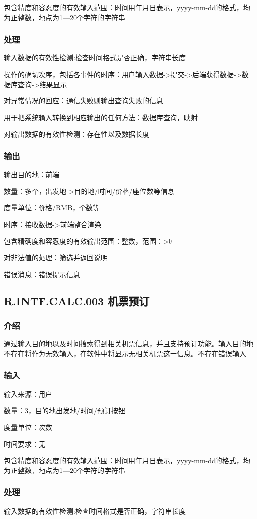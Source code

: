 		包含精度和容忍度的有效输入范围：时间用年月日表示，yyyy-mm-dd的格式，均为正整数，地点为1—20个字符的字符串
\subsubsection{处理}
	输入数据的有效性检测:检查时间格式是否正确，字符串长度

	操作的确切次序，包括各事件的时序：用户输入数据->提交->后端获得数据->数据库查询->结果显示

	对异常情况的回应：通信失败则输出查询失败的信息

	用于把系统输入转换到相应输出的任何方法：数据库查询，映射

	对输出数据的有效性检测：存在性以及数据长度
\subsubsection{输出}
		输出目的地：前端

		数量：多个，出发地->目的地/时间/价格/座位数等信息

		度量单位：价格/RMB，个数等

		时序：接收数据->前端整合渲染

		包含精确度和容忍度的有效输出范围：整数，范围：>0

		对非法值的处理：筛选并返回说明

		错误消息：错误提示信息




\subsection{R.INTF.CALC.003 机票预订}
\subsubsection{介绍}
通过输入目的地以及时间搜索得到相关机票信息，并且支持预订功能。输入目的地不存在将作为无效输入，在软件中将显示无相关机票这一信息。不存在错误输入
\subsubsection{输入}
		输入来源：用户

		数量：3，目的地出发地/时间/预订按钮

		度量单位：次数

		时间要求：无

		包含精度和容忍度的有效输入范围：时间用年月日表示，yyyy-mm-dd的格式，均为正整数，地点为1—20个字符的字符串
\subsubsection{处理}
	输入数据的有效性检测:检查时间格式是否正确，字符串长度

